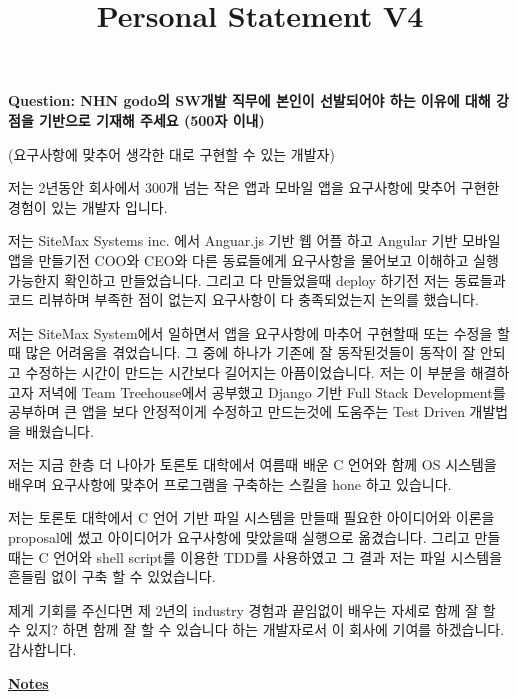 \documentclass[12pt]{article}
\begin{document}
\title{Personal Statement V4}
\maketitle

\textbf{Question: NHN godo의 SW개발 직무에 본인이 선발되어야 하는 이유에 대해 강점을 기반으로 기재해 주세요 (500자 이내)}

\bigskip

(요구사항에 맞추어 생각한 대로 구현할 수 있는 개발자)

\bigskip

저는 2년동안 회사에서 300개 넘는 작은 앱과 모바일 앱을 요구사항에 맞추어 구현한 경험이 있는 개발자 입니다.

\bigskip

저는 SiteMax Systems inc. 에서 Anguar.js 기반 웹 어플 하고 Angular 기반 모바일 앱을 만들기전 COO와 CEO와 다른 동료들에게 요구사항을 물어보고 이해하고 실행 가능한지 확인하고 만들었습니다.
그리고 다 만들었을때 deploy 하기전 저는 동료들과 코드 리뷰하며 부족한 점이 없는지 요구사항이 다 충족되었는지 논의를 했습니다.

\bigskip

저는 SiteMax System에서 일하면서 앱을 요구사항에 마추어 구현할때 또는 수정을 할때 많은 어려움을 겪었습니다.
그 중에 하나가 기존에 잘 동작된것들이 동작이 잘 안되고 수정하는 시간이 만드는 시간보다 길어지는 아픔이었습니다.
저는 이 부분을 해결하고자 저녁에 Team Treehouse에서 공부했고 Django 기반 Full Stack Development를
공부하며 큰 앱을 보다 안정적이게 수정하고 만드는것에 도움주는 Test Driven 개발법을 배웠습니다.

\bigskip

저는 지금 한층 더 나아가 토론토 대학에서 여름때 배운 C 언어와 함께 OS 시스템을 배우며 요구사항에 맞추어 프로그램을 구축하는 스킬을 hone 하고 있습니다.

\bigskip

저는 토론토 대학에서 C 언어 기반 파일 시스템을 만들때 필요한 아이디어와 이론을 proposal에 썼고 아이디어가 요구사항에 맞았을때 실행으로 옮겼습니다.
그리고 만들때는 C 언어와 shell script를 이용한 TDD를 사용하였고 그 결과 저는 파일 시스템을 흔들림 없이 구축 할 수 있었습니다.

\bigskip

제게 기회를 주신다면 제 2년의 industry 경험과 끝임없이 배우는 자세로 함께 잘 할 수 있지? 하면 함께 잘 할 수 있습니다
하는 개발자로서 이 회사에 기여를 하겠습니다. 감사합니다.

\underline{\textbf{Notes}}
\end{document}
